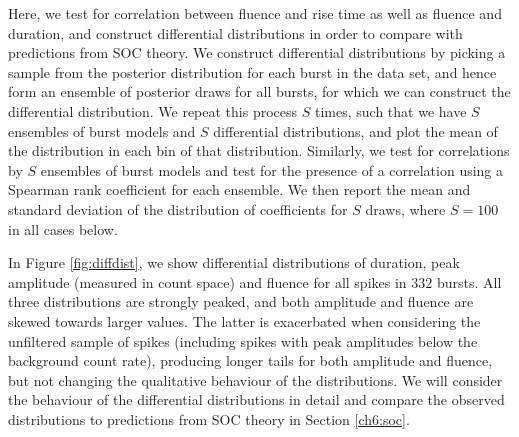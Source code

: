 \documentclass[12pt]{emulateapj}
\begin{document}
 Here, we test for correlation between fluence and rise time as well as fluence and duration, and construct differential distributions
 in order to compare with predictions from SOC theory. We construct differential distributions by picking a sample from the posterior distribution
 for each burst in the data set, and hence form an ensemble of posterior draws for all bursts, for which we can construct the differential distribution.
 We repeat this process $S$ times, such that we have $S$ ensembles of burst models and $S$ differential distributions, and plot the mean of the distribution in
 each bin of that distribution. 
 Similarly, we test for correlations by $S$ ensembles of burst models and test for the presence of a correlation using a Spearman rank
 coefficient for each ensemble. We then report the mean and standard deviation of the distribution of coefficients for $S$ draws, where $S = 100$ in all cases below.


 In Figure \ref{fig:diffdist}, we show differential distributions of duration, peak amplitude (measured in count space) and fluence for all spikes in $332$ bursts. All three distributions are
 strongly peaked, and both amplitude and fluence are skewed towards larger values. The latter is exacerbated when considering the unfiltered sample of 
 spikes (including spikes with peak amplitudes below the background count rate), producing longer tails for both amplitude and fluence, but not changing the qualitative behaviour of the distributions. We will consider the behaviour of
 the differential distributions in detail and compare the observed distributions to predictions from SOC theory in Section \ref{ch6:soc}.
\end{document}
